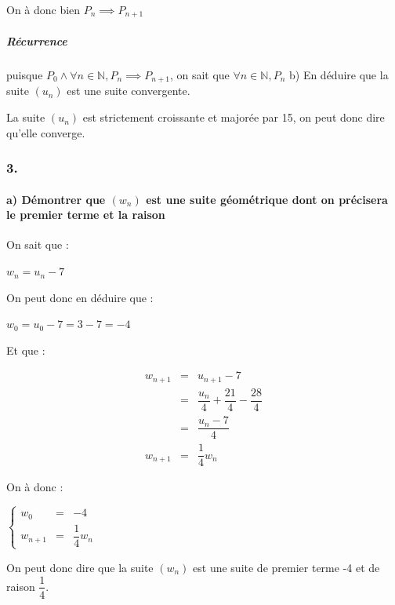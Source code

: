 \documentclass[]{scrartcl}
\let\oldparagraph\paragraph
\renewcommand{\paragraph}[1]{\oldparagraph{#1}\mbox{}}
\let\oldsubparagraph\subparagraph
\renewcommand{\subparagraph}[1]{\oldsubparagraph{#1}\mbox{}}
\begin{document}
On à donc bien \(P_n \implies P_{n+1}\)

\hypertarget{ruxe9currence}{%
\subparagraph{Récurrence}\label{ruxe9currence}}

puisque \(P_0 \wedge \forall n\in\mathbb{N}, P_n\implies P_{n+1}\), on
sait que \(\forall n\in\mathbb{N}, P_n\) b) En déduire que la suite
\((u_n)\) est une suite convergente.

La suite \((u_n)\) est strictement croissante et majorée par 15, on peut
donc dire qu'elle converge.

\hypertarget{section-2}{%
\subsubsection{3.}\label{section-2}}

\hypertarget{a-duxe9montrer-que-w_n-est-une-suite-guxe9omuxe9trique-dont-on-pruxe9cisera-le-premier-terme-et-la-raison}{%
\paragraph{\texorpdfstring{a) Démontrer que \((w_n)\) est une suite
géométrique dont on précisera le premier terme et la
raison}{a) Démontrer que (w\_n) est une suite géométrique dont on précisera le premier terme et la raison}}\label{a-duxe9montrer-que-w_n-est-une-suite-guxe9omuxe9trique-dont-on-pruxe9cisera-le-premier-terme-et-la-raison}}

On sait que :

\(w_n = u_n - 7\)

On peut donc en déduire que :

\(w_0=u_0-7=3-7=-4\)

Et que :

\[
\begin{array}{rcl}
    w_{n+1} &=& u_{n+1} - 7\\
            &=& \dfrac{u_n}{4} + \dfrac{21}{4} - \dfrac{28}{4}\\
            &=& \dfrac{u_n - 7}{4}\\
    w_{n+1} &=& \dfrac{1}{4}w_n
\end{array}
\]

On à donc :

\(\left\{\begin{array}{rcl}w_0 &=& -4\\w_{n+1} &=& \dfrac{1}{4}w_n\end{array}\right.\)

On peut donc dire que la suite \((w_n)\) est une suite de premier terme
-4 et de raison \(\dfrac{1}{4}\).
\end{document}

